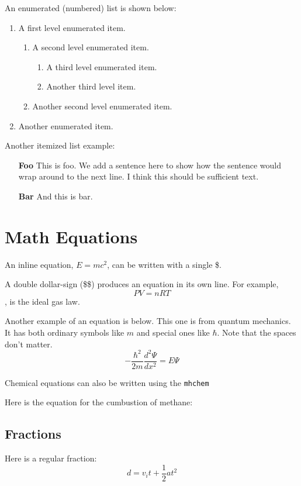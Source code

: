 \documentclass{article}
\begin{document}
\vspace{12pt}
An enumerated (numbered) list is shown below:
\begin{enumerate}
    \item A first level enumerated item.
    \begin{enumerate}
        \item A second level enumerated item.
        \begin{enumerate}
            \item A third level enumerated item.
            \item Another third level item.
        \end{enumerate}
        \item Another second level enumerated item.
    \end{enumerate}
    \item Another enumerated item.
\end{enumerate}

Another itemized list example:
\begin{enumerate}
    \item[\bfseries{Foo}] This is foo.  We add a sentence here to show how the sentence would
    wrap around to the next line.  I think this should be sufficient text.
    \item[\bfseries{Bar}] And this is bar.
\end{enumerate}

\cleardoublepage

\section{Math Equations}
An inline equation, $E = mc^2$, can be written with a single \$.

A double dollar-sign (\$\$) produces an equation in its own line.  For example, $$PV = nRT$$,
is the ideal gas law.

Another example of an equation is below.  This one is from quantum mechanics.  It has both ordinary
symbols like $m$ and special ones like $\hbar$.  Note that the spaces don't matter.
$$-\frac{\hbar^2}{2m} \frac{d^2 \Psi}{dx^2} = E \Psi$$

Chemical equations can also be written using the \texttt{mhchem}

Here is the equation for the cumbustion of methane:


\subsection{Fractions}
Here is a regular fraction:
$$d = v_i t + \frac{1}{2} a t^2$$
\end{document}
